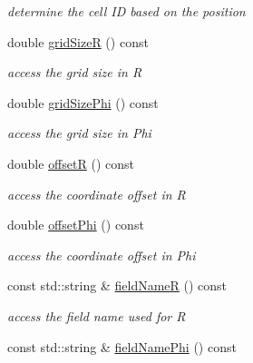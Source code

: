 \begin{DoxyCompactItemize}
\begin{DoxyCompactList}\small\item\em determine the cell ID based on the position \item\end{DoxyCompactList}\item 
double \hyperlink{class_d_d4hep_1_1_d_d_segmentation_1_1_polar_grid_r_phi_ad15c050c49a1ea4adf2929ff48830149}{gridSizeR} () const 
\begin{DoxyCompactList}\small\item\em access the grid size in R \item\end{DoxyCompactList}\item 
double \hyperlink{class_d_d4hep_1_1_d_d_segmentation_1_1_polar_grid_r_phi_a1b0b8842eae6d242c661d5322e1c0151}{gridSizePhi} () const 
\begin{DoxyCompactList}\small\item\em access the grid size in Phi \item\end{DoxyCompactList}\item 
double \hyperlink{class_d_d4hep_1_1_d_d_segmentation_1_1_polar_grid_r_phi_a449dc2e72e97117976fd9eae50c1e7c3}{offsetR} () const 
\begin{DoxyCompactList}\small\item\em access the coordinate offset in R \item\end{DoxyCompactList}\item 
double \hyperlink{class_d_d4hep_1_1_d_d_segmentation_1_1_polar_grid_r_phi_a9c6067462948379b0fee6e86eabfd139}{offsetPhi} () const 
\begin{DoxyCompactList}\small\item\em access the coordinate offset in Phi \item\end{DoxyCompactList}\item 
const std::string \& \hyperlink{class_d_d4hep_1_1_d_d_segmentation_1_1_polar_grid_r_phi_a5a08a8eec2ad2bbccb3b42b4bddea411}{fieldNameR} () const 
\begin{DoxyCompactList}\small\item\em access the field name used for R \item\end{DoxyCompactList}\item 
const std::string \& \hyperlink{class_d_d4hep_1_1_d_d_segmentation_1_1_polar_grid_r_phi_a150842292be492a82d3fb074535d770c}{fieldNamePhi} () const 

\end{DoxyCompactItemize}
